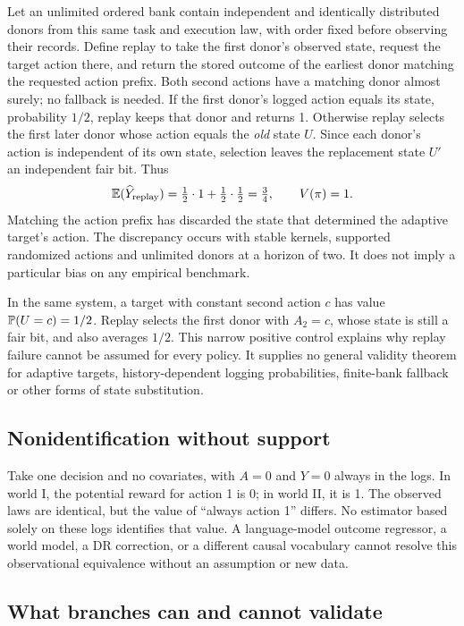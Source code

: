 Let an unlimited ordered bank contain independent and identically distributed donors from this same task and execution law, with order fixed before observing their records. Define replay to take the first donor's observed state, request the target action there, and return the stored outcome of the earliest donor matching the requested action prefix. Both second actions have a matching donor almost surely; no fallback is needed. If the first donor's logged action equals its state, probability \(1/2\), replay keeps that donor and returns 1. Otherwise replay selects the first later donor whose action equals the \emph{old} state \(U\). Since each donor's action is independent of its own state, selection leaves the replacement state \(U'\) an independent fair bit. Thus
\[
\E(\widehat Y_{\mathrm{replay}})
=\tfrac12\cdot1+\tfrac12\cdot\tfrac12
=\tfrac34,
\qquad V(\pi)=1.
\]
Matching the action prefix has discarded the state that determined the adaptive target's action. The discrepancy occurs with stable kernels, supported randomized actions and unlimited donors at a horizon of two. It does not imply a particular bias on any empirical benchmark.

In the same system, a target with constant second action \(c\) has value \(\P(U=c)=1/2\). Replay selects the first donor with \(A_2=c\), whose state is still a fair bit, and also averages \(1/2\). This narrow positive control explains why replay failure cannot be assumed for every policy. It supplies no general validity theorem for adaptive targets, history-dependent logging probabilities, finite-bank fallback or other forms of state substitution.

\subsection{Nonidentification without support}\label{nonidentification-without-support}

Take one decision and no covariates, with \(A=0\) and \(Y=0\) always in the logs. In world I, the potential reward for action 1 is 0; in world II, it is 1. The observed laws are identical, but the value of ``always action 1'' differs. No estimator based solely on these logs identifies that value. A language-model outcome regressor, a world model, a DR correction, or a different causal vocabulary cannot resolve this observational equivalence without an assumption or new data.

\subsection{What branches can and cannot validate}\label{what-branches-can-and-cannot-validate}

